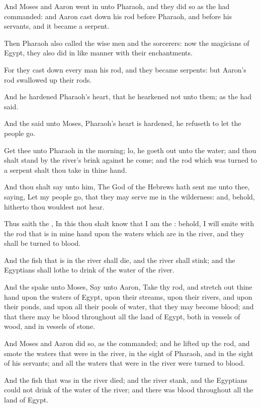 \verse And Moses and Aaron went in unto Pharaoh, and they did so as the
\LORD had commanded: and Aaron cast down his rod before Pharaoh, and
before his servants, and it became a serpent.

\verse Then Pharaoh also called the wise men and the sorcerers: now the
magicians of Egypt, they also did in like manner with their
enchantments.

\verse For they cast down every man his rod, and they became serpents:
but Aaron's rod swallowed up their rods.

\verse And he hardened Pharaoh's heart, that he hearkened not unto them;
as the \LORD had said.

\verse And the \LORD said unto Moses, Pharaoh's heart is hardened, he
refuseth to let the people go.

\verse Get thee unto Pharaoh in the morning; lo, he goeth out unto the
water; and thou shalt stand by the river's brink against he come; and
the rod which was turned to a serpent shalt thou take in thine hand.

\verse And thou shalt say unto him, The \LORD God of the Hebrews hath
sent me unto thee, saying, Let my people go, that they may serve me in
the wilderness: and, behold, hitherto thou wouldest not hear.

\verse Thus saith the \LORD, In this thou shalt know that I am the \LORD:
behold, I will smite with the rod that is in mine hand upon the waters
which are in the river, and they shall be turned to blood.

\verse And the fish that is in the river shall die, and the river shall
stink; and the Egyptians shall lothe to drink of the water of the
river.

\verse And the \LORD spake unto Moses, Say unto Aaron, Take thy rod, and
stretch out thine hand upon the waters of Egypt, upon their streams,
upon their rivers, and upon their ponds, and upon all their pools of
water, that they may become blood; and that there may be blood
throughout all the land of Egypt, both in vessels of wood, and in
vessels of stone.

\verse And Moses and Aaron did so, as the \LORD commanded; and he lifted
up the rod, and smote the waters that were in the river, in the sight
of Pharaoh, and in the sight of his servants; and all the waters that
were in the river were turned to blood.

\verse And the fish that was in the river died; and the river stank, and
the Egyptians could not drink of the water of the river; and there was
blood throughout all the land of Egypt.

